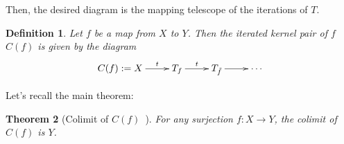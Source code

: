 \documentclass[preprint,9pt,numbers]{sigplanconf}
\makeatletter
\newtheorem{thm}{Theorem}
\newtheorem{defi}[thm]{Definition}
\def\dar[#1]#2{\ar@<-#2>[#1]\ar@<#2>[#1]} %
\def\tar[#1]#2{\ar@<#2>[#1]\ar@<0pt>[#1]\ar@<-#2>[#1]} %
\newenvironment{mymath}[1][-0em]{%
  \newcommand\mymathaux{\vspace{#1}}%
  \vspace{#1}%
  \begin{equation*}%
  }{ %
    \mymathaux%
  \end{equation*}}
\makeatother
\begin{document}
Then, the desired diagram is the mapping telescope of the iterations
of $T$.
\begin{defi}
  Let $f$ be a map from $X$ to $Y$. Then the iterated kernel pair of
  $f$ $C(f)$
  is given by the diagram
  \begin{mymath}\xymatrix{
    C(f) := X \ar[r]^-t & T_f \ar[r]^-t & T_{\tilde f} \ar[r] &\cdots
  }\end{mymath}%
\end{defi}

Let's recall the main theorem:
\begin{thm}[Colimit of $C(f)$~\cite{boulier}]\label{cech}
  For any surjection $f : X \to Y$, the colimit of $C(f)$ is $Y$.
\end{thm}




\end{document}
